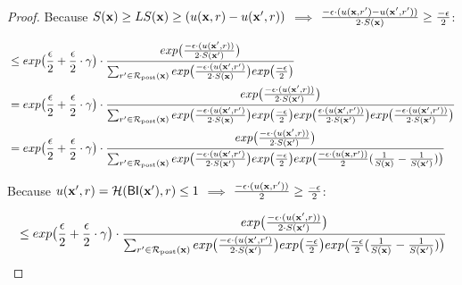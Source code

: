 \documentclass{article}
\begin{document}
\begin{proof}
  Because $S(\textbf{x}) \geq LS(\textbf{x}) \geq (u(\textbf{x}, {r}) - u(\textbf{x}', {r}))$ $\implies$ $ \frac{-\epsilon\cdot(u(\textbf{x}, {r'}) - u(\textbf{x}', {r'}))}{2 \cdot S(\textbf{x})} \geq \frac{-\epsilon}{2}$:

  \begin{equation*}
  \begin{split}
  & \leq exp\big( \frac{\epsilon}{2} + \frac{\epsilon}{2} \cdot \gamma\big) \cdot 
  \frac {
  exp
  \big(
  \frac{-\epsilon\cdot(u(\textbf{x}', {r}))}{2\cdot S(\textbf{x}')}
  \big)
  } 
  {
  \sum_{r'\in \mathcal{R}_{\textup{post}}(\textbf{x})} 
  exp 
  \big(
  \frac{-\epsilon\cdot(u(\textbf{x}', {r'})}{2 \cdot S(\textbf{x})}
  \big)
  exp 
  \big(
  \frac{-\epsilon}{2}
  \big)
  }\\
  & = exp\big( \frac{\epsilon}{2} + \frac{\epsilon}{2} \cdot \gamma\big) \cdot 
  \frac {
  exp
  \big(
  \frac{-\epsilon\cdot(u(\textbf{x}', {r}))}{2\cdot S(\textbf{x}')}
  \big)
  } 
  {
  \sum_{r'\in \mathcal{R}_{\textup{post}}(\textbf{x})} 
  exp 
  \big(
  \frac{-\epsilon\cdot(u(\textbf{x}', {r'})}{2 \cdot S(\textbf{x})}
  \big)
  exp 
  \big(
  \frac{-\epsilon}{2}
  \big)
  exp
  \big(
  \frac{\epsilon\cdot(u(\textbf{x}', {r'}))}{2\cdot S(\textbf{x}')}
  \big)
  exp
  \big(
  \frac{-\epsilon\cdot(u(\textbf{x}', {r'}))}{2\cdot S(\textbf{x}')}
  \big)
  }\\
  & = exp\big( \frac{\epsilon}{2} + \frac{\epsilon}{2} \cdot \gamma\big) \cdot 
  \frac {
  exp
  \big(
  \frac{-\epsilon\cdot(u(\textbf{x}', {r}))}{2\cdot S(\textbf{x}')}
  \big)
  } 
  {
  \sum_{r'\in \mathcal{R}_{\textup{post}}(\textbf{x})} 
  exp 
  \big(
  \frac{-\epsilon\cdot(u(\textbf{x}', {r'})}{2 \cdot S(\textbf{x}')}
  \big)
  exp 
  \big(
  \frac{-\epsilon}{2}
  \big)
  exp
  \big(
  \frac{- \epsilon\cdot(u(\textbf{x}, {r'}))}{2}
  (\frac{1}{S(\textbf{x})}
-
  \frac{1}{S(\textbf{x}')})
  \big)
  }\\
  \end{split}
  \end{equation*}

  Because $u(\textbf{x}', {r}) = \mathcal{H}(\mathsf{BI}(\textbf{x}'), r) \leq 1$ $\implies$ $\frac{- \epsilon\cdot(u(\textbf{x}, {r'}))}{2} \geq  \frac{-\epsilon}{2}$:

    \begin{equation*}
  \begin{split}
  & \leq exp\big( \frac{\epsilon}{2} + \frac{\epsilon}{2} \cdot \gamma\big) \cdot 
  \frac {
  exp
  \big(
  \frac{-\epsilon\cdot(u(\textbf{x}', {r}))}{2\cdot S(\textbf{x}')}
  \big)
  } 
  {
  \sum_{r'\in \mathcal{R}_{\textup{post}}(\textbf{x})} 
  exp 
  \big(
  \frac{-\epsilon\cdot(u(\textbf{x}', {r'})}{2 \cdot S(\textbf{x}')}
  \big)
  exp 
  \big(
  \frac{-\epsilon}{2}
  \big)
  exp
  \big(
  \frac{- \epsilon}{2}
  (\frac{1}{S(\textbf{x})}
-
  \frac{1}{S(\textbf{x}')})
  \big)
  }\\
  \end{split}
  \end{equation*}


\end{proof}
\end{document}
